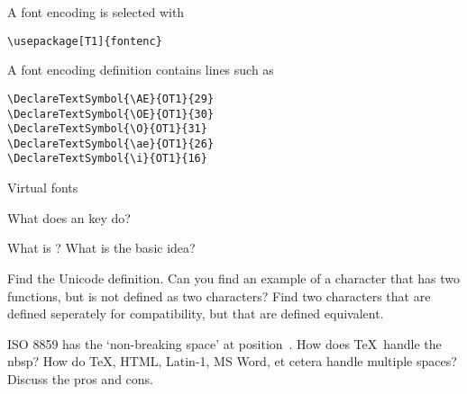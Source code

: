 A font encoding is selected with
\begin{verbatim}
\usepackage[T1]{fontenc}
\end{verbatim}
A font encoding definition contains lines such as
\begin{verbatim}
\DeclareTextSymbol{\AE}{OT1}{29}
\DeclareTextSymbol{\OE}{OT1}{30}
\DeclareTextSymbol{\O}{OT1}{31}
\DeclareTextSymbol{\ae}{OT1}{26}
\DeclareTextSymbol{\i}{OT1}{16}
\end{verbatim}

 {Virtual fonts}

\begin{594exercise}
What does an  key do?
\end{594exercise}

\begin{594exercise}
What is \ebcdic? What is the basic idea?
\end{594exercise}

\begin{594exercise}
Find the Unicode definition. Can you find an example of a
character that has two functions, but is not defined as two
characters? Find two characters that are defined seperately for
compatibility, but that are defined equivalent.
\end{594exercise}

\begin{594exercise}
ISO 8859 has the `non-breaking space' at position~. How
does \TeX\ handle the nbsp? How do \TeX, HTML, Latin-1, MS Word, et
cetera handle multiple spaces? Discuss the pros and cons.  
\end{594exercise}
